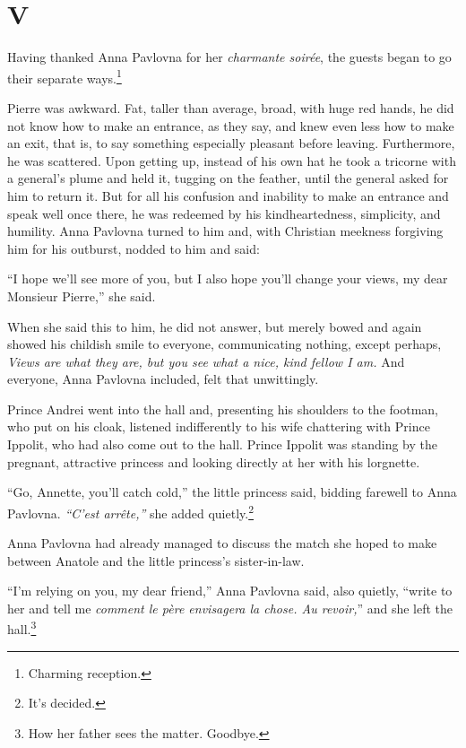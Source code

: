 \section{V} %

Having thanked Anna Pavlovna for her \textit{charmante soir\'ee}, the
guests began to go their separate ways.\footnote{Charming reception.}

Pierre was awkward. Fat, taller than average, broad, with huge red
hands, he did not know how to make an entrance, as they say, and knew
even less how to make an exit, that is, to say something especially
pleasant before leaving. Furthermore, he was scattered. Upon getting
up, instead of his own hat he took a tricorne with a general's plume
and held it, tugging on the feather, until the general asked for him
to return it. But for all his confusion and inability to make an
entrance and speak well once there, he was redeemed by his
kindheartedness, simplicity, and humility. Anna Pavlovna turned to him
and, with Christian meekness forgiving him for his outburst, nodded to
him and said:

``I hope we'll see more of you, but I also hope you'll change your
views, my dear Monsieur Pierre,'' she said.

When she said this to him, he did not answer, but merely bowed and
again showed his childish smile to everyone, communicating nothing,
except perhaps, \textit{Views are what they are, but you see what a
  nice, kind fellow I am.} And everyone, Anna Pavlovna included, felt
that unwittingly.

Prince Andrei went into the hall and, presenting his shoulders to the
footman, who put on his cloak, listened indifferently to his wife
chattering with Prince Ippolit, who had also come out to the
hall. Prince Ippolit was standing by the pregnant, attractive princess
and looking directly at her with his lorgnette.

``Go, Annette, you'll catch cold,'' the little princess said, bidding
farewell to Anna Pavlovna. \textit{``C'est arr\^ete,''} she added
quietly.\footnote{It's decided.}

Anna Pavlovna had already managed to discuss the match she hoped to
make between Anatole and the little princess's sister-in-law.

``I'm relying on you, my dear friend,'' Anna Pavlovna said, also
quietly, ``write to her and tell me \textit{comment le p\`ere
  envisagera la chose. Au revoir,}'' and she left the
hall.\footnote{How her father sees the matter. Goodbye.}


